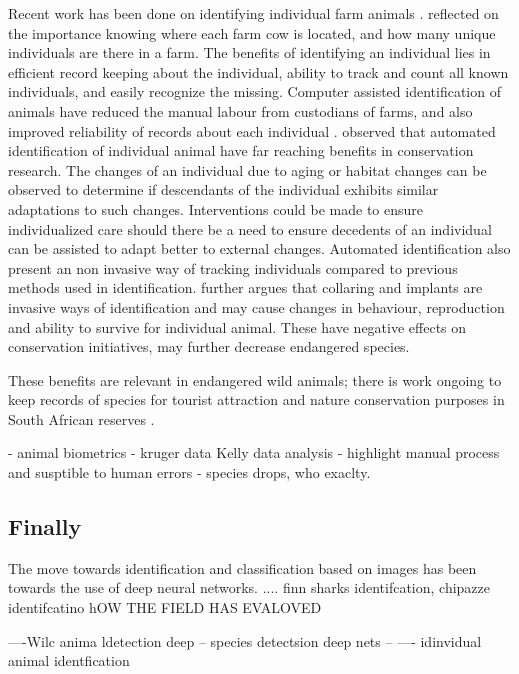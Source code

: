 Recent work has been done on identifying individual farm animals \cite{kumar2017real}. \citeauthor{kumar2017real} \citeyear{kumar2017real} \cite{kumar2017real} reflected on the importance knowing where each farm cow is located, and how many unique individuals are there in a farm. The benefits of identifying an individual lies in efficient record keeping about the individual, ability to track and count all known individuals, and easily recognize the missing. Computer assisted  identification of animals have reduced the manual labour from custodians of farms, and also improved reliability of records about each individual \citet{kuhl2013animal}. \citet{kuhl2013animal} observed that automated identification of individual animal have far reaching benefits in conservation research. The changes of an individual due to aging or habitat changes can be observed to determine if descendants of the individual exhibits similar adaptations to such changes. Interventions could be made to ensure individualized care should there be a need to ensure decedents of an individual can be assisted to adapt better to external changes. Automated identification also present an non invasive way of tracking individuals compared to previous methods used in identification. \citet{kuhl2013animal} further argues that collaring and implants are invasive ways of identification and may cause changes in behaviour, reproduction and ability to survive for individual animal. These have negative effects on conservation initiatives, may further decrease endangered species.

These benefits are relevant in endangered wild animals; there is work ongoing to keep records of species for tourist attraction and nature conservation purposes in South African reserves \cite{marnewick2008evaluating}.

- animal biometrics
- kruger data Kelly data analysis
- highlight manual process and susptible to human errors 
- species drops, who exaclty. 

\subsection{Finally}
The move towards identification and classification based on images has been towards the use of deep neural networks.  \cite{hughes2017automated}  .... finn sharks identifcation,
chipazze identifcatino \cite{loos2013automated}
hOW THE FIELD HAS EVALOVED \cite{weinstein2018computer}

----Wilc anima ldetection  deep  \cite{verma2018wild}
-- species detectsion deep nets -- 
---- idinvidual animal identfication \cite{schneider2019similarity}

